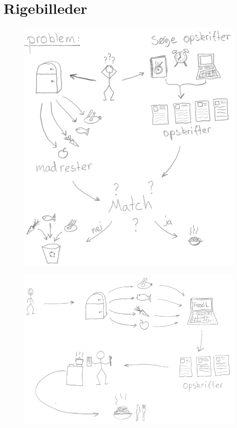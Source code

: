 \chapter{Rigebilleder}
\label{ap:rigebilleder}

\begin{figure}[H]
\centering
\includegraphics[scale=0.7]{billeder/rigebilleder/problemomraade.png}
\label{fig:rigbillede_po}
\end{figure}

\begin{figure}[H]
\centering
\includegraphics[scale=0.7]{billeder/rigebilleder/anvendelsesomraade.png}
\label{fig:rigbillede_ao}
\end{figure}